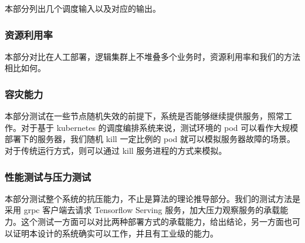  本部分列出几个调度输入以及对应的输出。

\subsubsection{资源利用率}

本部分对比在人工部署，逻辑集群上不堆叠多个业务时，资源利用率和我们的方法相比如何。

\subsubsection{容灾能力}

本部分测试在一些节点随机失效的前提下，系统是否能够继续提供服务，照常工作。对于基于 kubernetes 的调度编排系统来说，测试环境的 pod 可以看作大规模部署下的服务器，我们随机 kill 一定比例的 pod 就可以模拟服务器故障的场景。对于传统运行方式，则可以通过 kill 服务进程的方式来模拟。

\subsubsection{性能测试与压力测试}

本部分测试整个系统的抗压能力，不止是算法的理论推导部分。我们的测试方法是采用 grpc 客户端去请求 Tensorflow Serving 服务，加大压力观察服务的承载能力。这个测试一方面可以对比两种部署方式的承载能力，给出结论，另一方面也可以证明本设计的系统确实可以工作，并且有工业级的能力。

